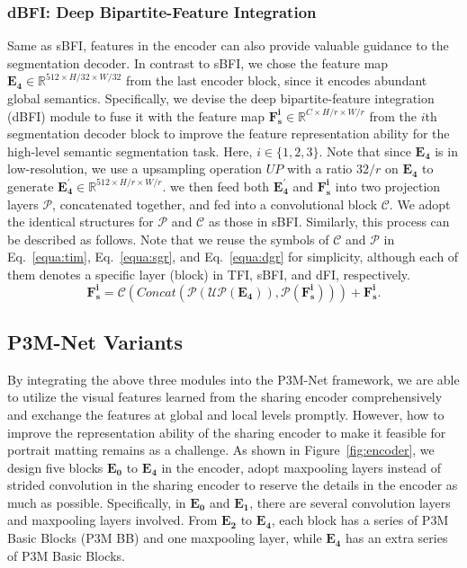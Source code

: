 \documentclass[twocolumn]{svjour3}
\begin{document}
\subsubsection{dBFI: Deep Bipartite-Feature Integration}
Same as sBFI, features in the encoder can also provide valuable guidance to the segmentation decoder. In contrast to sBFI, we chose the feature map $\mathbf{E_4}\in \mathbb{R}^{512\times H/32 \times W/32}$ from the last encoder block, since it encodes abundant global semantics. Specifically, we devise the deep bipartite-feature integration (dBFI) module to fuse it with the feature map $\mathbf{F_s^i}\in\mathbb{R}^{C\times H/r \times W/r}$ from the $i$th segmentation decoder block to improve the feature representation ability for the high-level semantic segmentation task. Here, $i\in \{1,2,3\}$. Note that since $\mathbf{E_4}$ is in low-resolution, we use a upsampling operation $UP$ with a ratio $32/r$ on $\mathbf{E_4}$ to generate $\mathbf{E_4^{'}}\in \mathbb{R}^{512\times H/r \times W/r}$. we then feed both $\mathbf{E_4^{'}}$ and $\mathbf{F_s^i}$ into two projection layers $\mathcal{P}$, concatenated together, and fed into a convolutional block $\mathcal{C}$. We adopt the identical structures for $\mathcal{P}$ and $\mathcal{C}$ as those in sBFI. Similarly, this process can be described as follows. Note that we reuse the symbols of $\mathcal{C}$ and $\mathcal{P}$ in Eq.~\ref{equa:tim}, Eq.~\ref{equa:sgr}, and Eq.~\ref{equa:dgr} for simplicity, although each of them denotes a specific layer (block) in TFI, sBFI, and dFI, respectively.
\begin{equation}
\mathbf{F_s^i} = \mathcal{C}(Concat(\mathcal{P}(\mathcal{UP}(\mathbf{E_4})),\mathcal{P}(\mathbf{F^i_s})))+\mathbf{F_s^i}.
\label{equa:dgr}
\end{equation}


\subsection{P3M-Net Variants}
\label{sec:variants}
By integrating the above three modules into the P3M-Net framework, we are able to utilize the visual features learned from the sharing encoder comprehensively and exchange the features at global and local levels promptly. However, how to improve the representation ability of the sharing encoder to make it feasible for portrait matting remains as a challenge. As shown in Figure~\ref{fig:encoder}, we design five blocks $\mathbf{E_0}$ to $\mathbf{E_4}$ in the encoder, adopt maxpooling layers instead of strided convolution in the sharing encoder to reserve the details in the encoder as much as possible. Specifically, in $\mathbf{E_0}$ and $\mathbf{E_1}$, there are several convolution layers and maxpooling layers involved. From $\mathbf{E_2}$ to $\mathbf{E_4}$, each block has a series of P3M Basic Blocks (P3M BB) and one maxpooling layer, while $\mathbf{E_4}$ has an extra series of P3M Basic Blocks.
\end{document}
